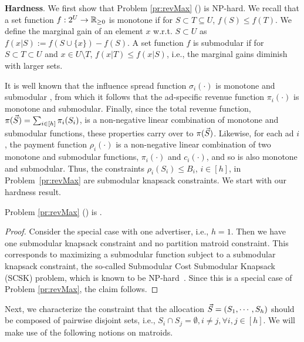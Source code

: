 {\bf Hardness}. We first show that Problem \ref{pr:revMax} (\RM) is NP-hard. We recall that a set function $f:2^U\rightarrow \mathbb{R}_{\ge 0}$ is monotone if for $S\subset T\subseteq U$, $f(S) \le f(T)$. We define the marginal gain of an element $x$ w.r.t. $S\subset U$ as $f(x|S) := f(S\cup\{x\}) - f(S)$. A set function $f$ is submodular if for $S\subset T\subset U$ and $x\in U\setminus T$, $f(x|T) \le f(x|S)$, i.e., the marginal gains diminish with larger sets.

It is well known that the influence spread function $\sigma_i(\cdot)$ is monotone and submodular \cite{kempe03}, from which it follows that the  ad-specific revenue function $\pi_i(\cdot)$ is monotone and submodular. Finally, since the total revenue function, $\pi(\vec{S}) = \sum_{i \in [h]} \pi_i(S_i)$, is a non-negative linear combination of monotone and submodular functions, these properties carry over to $\pi(\vec{S})$. Likewise, for each ad $i$, the payment function $\rho_i(\cdot)$ is a non-negative linear combination of two monotone and submodular functions, $\pi_i(\cdot)$ and $c_i(\cdot)$, and so is also monotone and submodular. Thus, the constraints $\rho_i(S_i) \le B_i$, $i\in[h]$, in Problem~\ref{pr:revMax} are submodular knapsack constraints. We start with our hardness result.

\begin{theorem}\label{claim:npHard}
Problem \ref{pr:revMax} (\RM) is \NPhard.
\end{theorem}

\begin{proof}
Consider the special case with one advertiser, i.e., $h = 1$. Then we have one submodular knapsack constraint and no partition matroid constraint. This corresponds to maximizing a submodular function subject to a submodular knapsack constraint, the so-called Submodular Cost Submodular Knapsack (SCSK) problem, which is known to be NP-hard~\cite{iyer2013submodular}. Since this is a special case of Problem \ref{pr:revMax}, the claim follows.
\end{proof}

Next, we characterize the constraint that the allocation $\vec{S} = (S_1, \cdots, S_h)$ should be composed of pairwise disjoint sets, i.e., $S_i \cap S_j = \emptyset , i \neq j, \forall i,j \in [h]$. We will make use of the following notions on matroids.
\enlargethispage{2\baselineskip}

